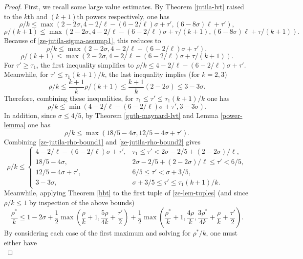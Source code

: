 \begin{proof}
First, we recall some large value estimates. By Theorem \ref{jutila-lvt} raised to the $k$th and $(k + 1)$th powers respectively, one has 
\[
\rho/k \le \max(2 - 2\sigma, 4 - 2/\ell - (6 - 2/\ell)\sigma + \tau', (6 - 8\sigma)\ell + \tau'),
\]
\[
\rho/(k + 1) \le \max(2 - 2\sigma, 4 - 2/\ell - (6 - 2/\ell)\sigma + \tau/(k + 1), (6 - 8\sigma)\ell + \tau/(k + 1)).
\]
Because of \eqref{ze-jutila-sigma-assump1}, this reduces to 
\[
\rho/k \le \max(2 - 2\sigma, 4 - 2/\ell - (6 - 2/\ell)\sigma + \tau'),
\]
\[
\rho/(k + 1) \le \max(2 - 2\sigma, 4 - 2/\ell - (6 - 2/\ell)\sigma + \tau/(k + 1)).
\]
For $\tau' \ge \tau_1$, the first inequality simplifies to $\rho/k \le 4 - 2/\ell - (6 - 2/\ell)\sigma + \tau'$. Meanwhile, for $\tau' \le \tau_1(k + 1)/k$, the last inequality implies (for $k = 2, 3$)
\[
\rho/k \le \frac{k + 1}{k}\rho/(k + 1) \le \frac{k + 1}{k}(2 - 2\sigma) \le 3 - 3\sigma.
\]
Therefore, combining these inequalities, for $\tau_1 \le \tau' \le \tau_1(k + 1)/k$ one has 
\begin{equation}\label{ze-jutila-rho-bound1}
\rho/k \le \min(4 - 2/\ell - (6 - 2/\ell)\sigma + \tau', 3 - 3\sigma).
\end{equation}
In addition, since $\sigma \le 4/5$, by Theorem \ref{guth-maynard-lvt} and Lemma \ref{power-lemma} one has
\begin{equation}\label{ze-jutila-rho-bound2}
\rho/k \le \max(18/5 - 4\sigma, 12/5 - 4\sigma + \tau').
\end{equation}
Combining \eqref{ze-jutila-rho-bound1} and \eqref{ze-jutila-rho-bound2} gives 
\[
\rho/k \le \begin{cases}
4 - 2/\ell - (6 - 2/\ell)\sigma + \tau',& \tau_1 \le \tau' < 2\sigma - 2/5 + (2 -2\sigma)/\ell,\\
18/5 - 4\sigma,& 2\sigma - 2/5 + (2 -2\sigma)/\ell \le \tau' < 6/5,\\
12/5 - 4\sigma + \tau',& 6/5 \le \tau' < \sigma + 3/5,\\
3 - 3\sigma,& \sigma + 3/5 \le \tau' \le \tau_1(k + 1)/k.
\end{cases}
\]
Meanwhile, applying Theorem \ref{hbt} to the first tuple of \eqref{ze-lem-tuples} (and since $\rho/k \le 1$ by inspection of the above bounds)
\[
\frac{\rho^*}{k} \le 1-2\sigma + \frac{1}{2}\max(\frac{\rho}{k}+1, \frac{5\rho}{4k} + \frac{\tau'}{2}) + \frac{1}{2}\max(\frac{\rho^*}{k}+1, \frac{4\rho}{k}, \frac{3\rho^*}{4k} +\frac{\rho}{k}+\frac{\tau'}{2}).
\]
By considering each case of the first maximum and solving for $\rho^*/k$, one must either have 
\begin{equation}\label{ze-jutila-rhostar-bound-case01}

\end{equation}
\end{proof}
